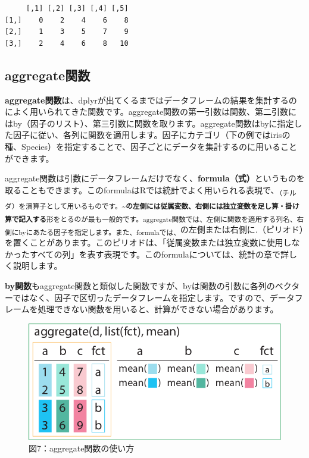 \documentclass[
  letterpaper,
  DIV=11,
  numbers=noendperiod]{scrreprt}
\begin{document}
\begin{verbatim}
     [,1] [,2] [,3] [,4] [,5]
[1,]    0    2    4    6    8
[2,]    1    3    5    7    9
[3,]    2    4    6    8   10
\end{verbatim}

\hypertarget{aggregateux95a2ux6570}{%
\subsection{aggregate関数}\label{aggregateux95a2ux6570}}

\textbf{aggregate関数}は、dplyrが出てくるまではデータフレームの結果を集計するのによく用いられてきた関数です。aggregate関数の第一引数は関数、第二引数にはby（因子のリスト）、第三引数に関数を取ります。aggregate関数はbyに指定した因子に従い、各列に関数を適用します。因子にカテゴリ（下の例ではirisの種、Species）を指定することで、因子ごとにデータを集計するのに用いることができます。

aggregate関数は引数にデータフレームだけでなく、\textbf{formula（式）}というものを取ることもできます。このformulaはRでは統計でよく用いられる表現で、\textsubscript{（チルダ）を演算子として用いるものです。\textbf{\textasciitilde の左側には従属変数、右側には独立変数を足し算・掛け算で記入する}形をとるのが最も一般的です。aggregate関数では、左側に関数を適用する列名、右側にbyにあたる因子を指定します。また、formulaでは、}の左側または右側に.（ピリオド）を置くことがあります。このピリオドは、「従属変数または独立変数に使用しなかったすべての列」を表す表現です。このformulaについては、統計の章で詳しく説明します。

\textbf{by関数}もaggregate関数と類似した関数ですが、byは関数の引数に各列のベクターではなく、因子で区切ったデータフレームを指定します。ですので、データフレームを処理できない関数を用いると、計算ができない場合があります。

\begin{figure}

{\centering \includegraphics{././image/chapter15_aggregate.png}

}

\caption{図7：aggregate関数の使い方}

\end{figure}
\end{document}

